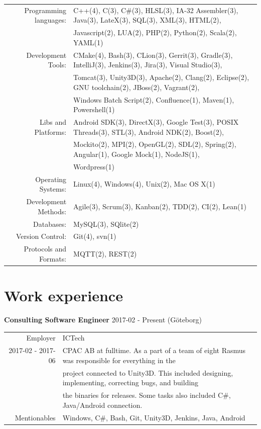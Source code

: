 \documentclass[a4paper,10pt]{article}
\begin{document}
\begin{tabular}{rl}
Programming languages:&
C++(4),
C(3),
C\#(3),
HLSL(3),
IA-32 Assembler(3),
Java(3),
LateX(3),
SQL(3),
XML(3),
HTML(2),\\&
Javascript(2),
LUA(2),
PHP(2),
Python(2),
Scala(2),
YAML(1)\\

Development Tools:&
CMake(4),
Bash(3),
CLion(3),
Gerrit(3),
Gradle(3),
IntelliJ(3),
Jenkins(3),
Jira(3),
Visual Studio(3),\\&
Tomcat(3),
Unity3D(3),
Apache(2),
Clang(2),
Eclipse(2),
GNU toolchain(2),
JBoss(2),
Vagrant(2),\\&
Windows Batch Script(2),
Confluence(1),
Maven(1),
Powershell(1)\\

Libs and Platforms:&
Android SDK(3),
DirectX(3),
Google Test(3),
POSIX Threads(3),
STL(3),
Android NDK(2),
Boost(2),\\&
Mockito(2),
MPI(2),
OpenGL(2),
SDL(2),
Spring(2),
Angular(1),
Google Mock(1),
NodeJS(1),\\&
Wordpress(1)\\

Operating Systems:&
Linux(4),
Windows(4),
Unix(2),
Mac OS X(1)\\

Development Methods:&
Agile(3),
Scrum(3),
Kanban(2),
TDD(2),
CI(2),
Lean(1)\\

Databases:&
MySQL(3),
SQlite(2)\\

Version Control:&
Git(4),
svn(1)\\

Protocols and Formats:&
MQTT(2),
REST(2)\\

\end{tabular}

\section{Work experience}

\textbf{Consulting Software Engineer} 2017-02 - Present (Göteborg) \\
\begin{tabular}{rl}
Employer& ICTech\\
2017-02 - 2017-06& CPAC AB at fulltime. As a part of a team of eight Rasmus was responsible for everything in the\\& project connected to Unity3D.  This included designing, implementing, correcting bugs, and building\\& the binaries for releases. Some tasks also included C\#, Java/Android connection.\\
Mentionables& Windows, C\#, Bash, Git, Unity3D, Jenkins, Java, Android
\end{tabular}
\end{document}
